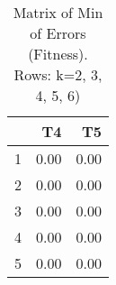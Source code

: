\begin{table}[ht]
\centering
\begin{tabular}{rrr}
  \hline
 & T4 & T5 \\ 
  \hline
1 & 0.00 & 0.00 \\ 
  2 & 0.00 & 0.00 \\ 
  3 & 0.00 & 0.00 \\ 
  4 & 0.00 & 0.00 \\ 
  5 & 0.00 & 0.00 \\ 
   \hline
\end{tabular}
\caption{Matrix of Min of Errors (Fitness). Rows: k=2, 3, 4, 5, 6)} 
\end{table}
